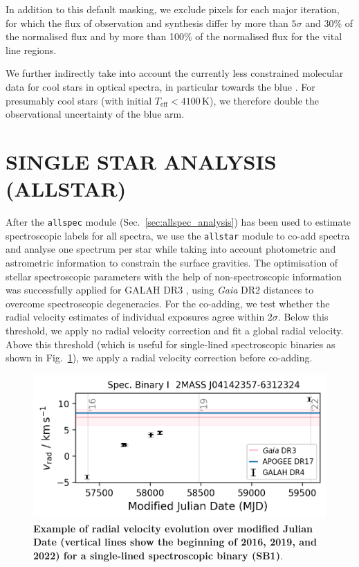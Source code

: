 \documentclass[
  journal=pasa,
  manuscript=research-paper, %
  year=2024,
  volume=37
]{cup-journal}
\newcommand{\Gaia}{\textit{Gaia}\xspace}
\begin{document}
In addition to this default masking, we exclude pixels for each major iteration, for which the flux of observation and synthesis differ by more than $5 \sigma$ and 30\% of the normalised flux and by more than 100\% of the normalised flux for the vital line regions.

We further indirectly take into account the currently less constrained molecular data for cool stars in optical spectra, in particular towards the blue \citep[e.g.][]{Rains2021,Rains2024}. For presumably cool stars (with initial $T_\text{eff} < 4100\,\mathrm{K}$), we therefore double the observational uncertainty of the blue arm.

\section{SINGLE STAR ANALYSIS (ALLSTAR)}
\label{sec:allstar_analysis}

After the \texttt{allspec} module (Sec.~\ref{sec:allspec_analysis}) has been used to estimate spectroscopic labels for all spectra, we use the \texttt{allstar} module to co-add spectra and analyse one spectrum per star while taking into account photometric and astrometric information to constrain the surface gravities. The optimisation of stellar spectroscopic parameters with the help of non-spectroscopic information was successfully applied for GALAH DR3 \citep{Buder2021}, using \Gaia DR2 distances \citep{BailerJones2018} to overcome spectroscopic degeneracies. For the co-adding, we test whether the radial velocity estimates of individual exposures agree within $2\sigma$. Below this threshold, we apply no radial velocity correction and fit a global radial velocity. Above this threshold (which is useful for single-lined spectroscopic binaries as shown in Fig.~\ref{fig:examples_flag_sp_2}), we apply a radial velocity correction before co-adding.

\begin{figure}[ht]
 \centering
 \includegraphics[width=\textwidth]{figures/examples_flag_sp_2.png}
 \caption{\textbf{Example of radial velocity evolution over modified Julian Date (vertical lines show the beginning of 2016, 2019, and 2022) for a single-lined spectroscopic binary (SB1)}.}
 \label{fig:examples_flag_sp_2}
\end{figure}
\end{document}
